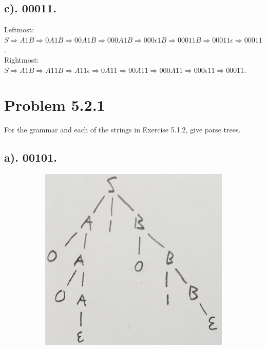\documentclass[20pt]{article} %
\begin{document}
\subsection{c). 00011.}
Leftmost:\\
$S \Rightarrow A1B \Rightarrow 0A1B \Rightarrow 00A1B \Rightarrow 000A1B \Rightarrow 000\epsilon1B \Rightarrow 00011B \Rightarrow 00011\epsilon \Rightarrow 00011$. \\
Rightmost:\\
$S \Rightarrow A1B \Rightarrow A11B \Rightarrow A11\epsilon \Rightarrow 0A11 \Rightarrow 00A11 \Rightarrow 000A11 \Rightarrow 000\epsilon11 \Rightarrow 00011$.

\newpage
\section{Problem 5.2.1}
For the grammar and each of the strings in Exercise 5.1.2, give parse trees. 
\subsection{a). 00101.}
\begin{figure}[!htbp]
  	\centering
   	\begin{subfigure}[p]{0.5\linewidth}
    	\includegraphics[width=\linewidth]{./figures/h6-1.jpg}
   	\end{subfigure}
\end{figure} 
\end{document}
